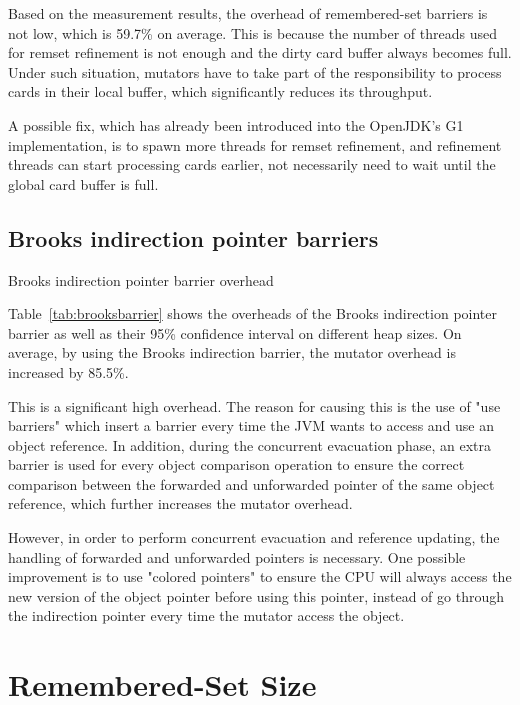 Based on the measurement results, the overhead of remembered-set barriers is not low,
which is 59.7\% on average. This is because the number of threads used for remset refinement
is not enough and the dirty card buffer always becomes full. Under such situation,
mutators have to take part of the responsibility to process cards in their local buffer,
which significantly reduces its throughput.

A possible fix, which has already been introduced into the OpenJDK's G1 implementation, is
to spawn more threads for remset refinement, and refinement threads can start processing cards earlier,
not necessarily need to wait until the global card buffer is full.

\subsection{Brooks indirection pointer barriers}

\begin{table*}
  \centering
  
  \caption{Brooks indirection pointer barrier overhead}
  \label{tab:brooksbarrier}
\end{table*}

Table~\ref{tab:brooksbarrier} shows the overheads of the Brooks indirection pointer barrier
as well as their 95\% confidence interval on different heap sizes.
On average, by using the Brooks indirection barrier, the mutator overhead
is increased by 85.5\%.

This is a significant high overhead. The reason for causing this is the use of 
"use barriers" which insert a barrier every time the JVM wants to access and use
an object reference. In addition, during the concurrent evacuation phase,
an extra barrier is used for every object comparison operation
to ensure the correct comparison between the forwarded and unforwarded pointer of the same object reference,
which further increases the mutator overhead.

However, in order to perform concurrent evacuation and reference updating, the handling
of forwarded and unforwarded pointers is necessary.
One possible improvement is to use "colored pointers" to ensure the CPU will always access
the new version of the object pointer before using this pointer,
instead of go through the indirection pointer every time the mutator access the object.

\section{Remembered-Set Size} %
\label{sec:remsetsize}

